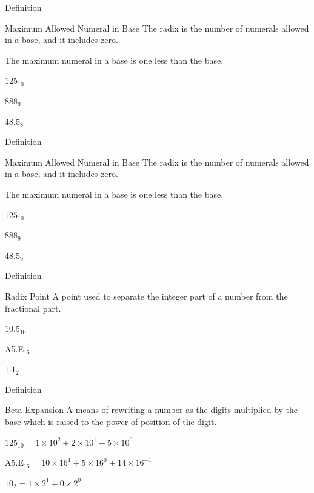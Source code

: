 \documentclass{beamer}
\begin{document}
\begin{frame}{Definition}
  \begin{block}{Maximum Allowed Numeral in Base}
    The radix is the number of numerals allowed in a base, and it includes zero. \pause

    The maximum numeral in a base is one less than the base.
  \end{block}\pause

  \begin{example}\pause
    $125_{10}$ \pause

    $888_9$ \pause

    $48.5_8$
  \end{example}
\end{frame}
\begin{frame}{Definition}
  \addtocounter{framenumber}{-1}
  \begin{block}{Maximum Allowed Numeral in Base}
    The radix is the number of numerals allowed in a base, and it includes zero.

    The maximum numeral in a base is one less than the base.
  \end{block}

  \begin{example}
    $125_{10}$

    $888_9$

    $48.5_9$
  \end{example}
\end{frame}

\begin{frame}{Definition}
  \begin{block}{Radix Point}
    A point used to separate the integer part of a number from the fractional part.
  \end{block}\pause

  \begin{example}\pause
      $10.5_{10}$ \pause

      A5.E$_{16}$ \pause

      $1.1_2$
  \end{example}
\end{frame}

\begin{frame}{Definition}
  \begin{block}{Beta Expansion}
    A means of rewriting a number as the digits multiplied by the base which is raised to the power of position of the digit.
  \end{block}\pause

  \begin{example}\pause
    $125_{10} = 1\times10^2 + 2\times10^1 + 5\times10^0$ \pause

    A5.E$_{16} = 10\times16^1 + 5\times16^0 + 14\times16^{-1}$ \pause

    $10_2 = 1\times2^1+0\times2^0$
  \end{example}
\end{frame}
\end{document}
